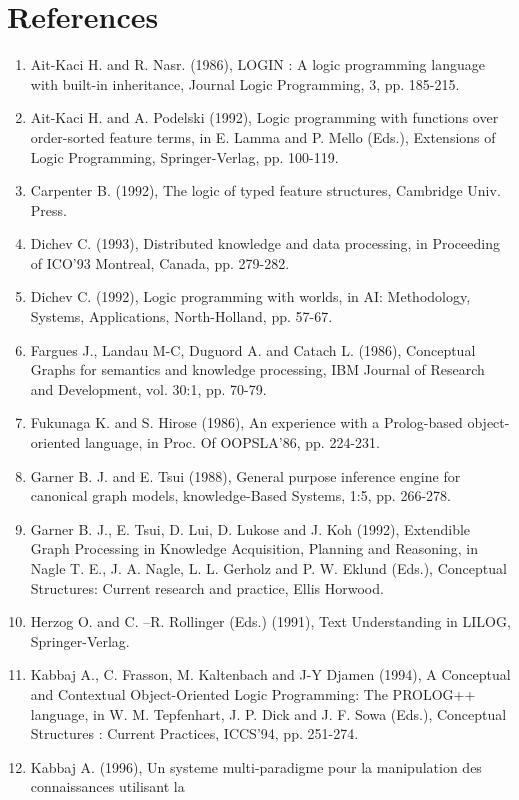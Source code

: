 \documentclass{book}
\begin{document}
\chapter{References}\label{Sec:References}
\begin{enumerate}
\item Ait-Kaci H. and R. Nasr. (1986), LOGIN : A logic programming
language with built-in inheritance, Journal Logic Programming, 3,
pp. 185-215.
\item Ait-Kaci H. and A. Podelski
(1992), Logic programming with functions over order-sorted feature
terms, in E. Lamma and P. Mello (Eds.), Extensions of Logic
Programming, Springer-Verlag, pp. 100-119.
\item Carpenter B. (1992), The logic
of typed feature structures, Cambridge Univ. Press.
\item Dichev C. (1993), Distributed
knowledge and data processing, in Proceeding of ICO'93
Montreal, Canada, pp. 279-282.
\item Dichev C. (1992), Logic
programming with worlds, in AI: Methodology, Systems,
Applications, North-Holland, pp. 57-67.
\item Fargues J., Landau M-C, Duguord
A. and Catach L. (1986), Conceptual Graphs for semantics and
knowledge processing, IBM Journal of Research and Development, vol.
30:1, pp. 70-79.
\item Fukunaga K. and S. Hirose
(1986), An experience with a Prolog-based object-oriented language,
in Proc. Of OOPSLA'86, pp. 224-231.
\item Garner B. J. and E. Tsui (1988),
General purpose inference engine for canonical graph models,
knowledge-Based Systems, 1:5, pp. 266-278.
\item Garner B. J., E. Tsui, D. Lui,
D. Lukose and J. Koh (1992), Extendible Graph Processing in
Knowledge Acquisition, Planning and Reasoning, in Nagle T. E., J.
A. Nagle, L. L. Gerholz and P. W. Eklund (Eds.), Conceptual
Structures: Current research and practice, Ellis
Horwood.
\item Herzog O. and C. --R.
Rollinger (Eds.) (1991), Text Understanding in LILOG,
Springer-Verlag.
\item Kabbaj A., C. Frasson, M.
Kaltenbach and J-Y Djamen (1994), A Conceptual and Contextual
Object-Oriented Logic Programming: The PROLOG++ language, in W. M.
Tepfenhart, J. P. Dick and J. F. Sowa (Eds.), Conceptual Structures
: Current Practices, ICCS'94, pp. 251-274.
\item Kabbaj A. (1996), Un systeme
multi-paradigme pour la manipulation des connaissances utilisant la

\end{enumerate}
\end{document}
